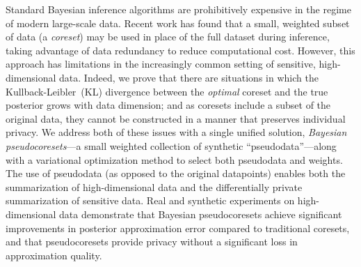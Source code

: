 {
Standard Bayesian inference algorithms are prohibitively expensive in the
regime of modern large-scale data. Recent work has found that
a small, weighted subset of data (a \emph{coreset}) may be used in place
of the full dataset during inference, taking advantage of data redundancy to
reduce computational cost. However, this approach has limitations 
in the increasingly common setting of sensitive, high-dimensional data. 
Indeed, we prove that there are situations in which 
the Kullback-Leibler~(KL) divergence between the \emph{optimal} coreset 
and the true posterior grows with data dimension; and as coresets include
a subset of the original data, they cannot be constructed in a manner
that preserves individual privacy.
We address both of these issues with a single unified solution, \emph{Bayesian
pseudocoresets}---a small weighted collection of synthetic
``pseudodata''---along with a variational optimization method to select both
pseudodata and weights.  The use of pseudodata (as opposed to
the original datapoints) enables both the summarization of high-dimensional data
and the  differentially private summarization of
sensitive data. Real and
synthetic experiments on high-dimensional data demonstrate that Bayesian 
pseudocoresets achieve significant improvements in posterior approximation error compared to
traditional coresets, and that pseudocoresets provide privacy without
a significant loss in approximation quality. 
}



